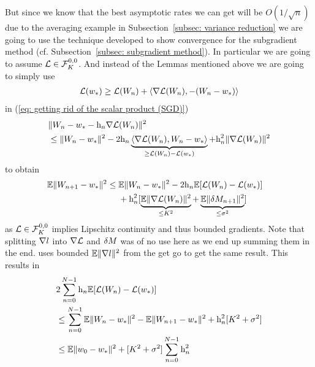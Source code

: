 But since we know that the best asymptotic rates we can get will be
\(O(1/\sqrt{n})\) due to the averaging example in Subsection~\ref{subsec:
variance reduction} we are going to use the technique developed to show
convergence for the subgradient method (cf. Subsection~\ref{subsec: subgradient
method}).
In particular we are going to assume \(\Loss \in
\lipGradientSet[0,0]{\lipConst}\). And instead of the Lemmas mentioned above we
are going to simply use 
\begin{align*}
	\Loss(\minimum)
	\ge \Loss(\Weights_n) + 
	\langle\nabla\Loss(\Weights_n), -(\Weights_n - \minimum)\rangle
\end{align*}
in (\ref{eq: getting rid of the scalar product (SGD)})
\begin{align*}
	&\|\Weights_n - \minimum - \lr_n\nabla\Loss(\Weights_n)\|^2\\
	&\le \|\Weights_n - \minimum\|^2
	- 2\lr_n\underbrace{\langle\nabla\Loss(\Weights_n), \Weights_n-\minimum\rangle}_{
		\ge \Loss(\Weights_n) - \Loss(\minimum)
	}
	+ \lr_n^2 \|\nabla\Loss(\Weights_n)\|^2
\end{align*}
to obtain
\begin{align*}
	\E\|\Weights_{n+1}-\minimum\|^2
	&\le
	\begin{aligned}[t]
		&\E\|\Weights_n -\minimum\|^2
		- 2\lr_n \E[\Loss(\Weights_n) - \Loss(\minimum)]\\
		&+ \lr_n^2 [
			\underbrace{\E\|\nabla\Loss(\Weights_n)\|^2}_{\le \lipConst^2}
			+ \underbrace{\E\|\martIncr_{n+1}\|^2}_{\le \stdBound^2}
		]
	\end{aligned}
\end{align*}
as \(\Loss\in\lipGradientSet[0,0]{\lipConst}\) implies Lipschitz continuity and thus bounded
gradients. Note that splitting \(\nabla\loss\) into \(\nabla\Loss\) and \(\martIncr\)
was of no use here as we end up summing them in the end. \textcite{nemirovskiRobustStochasticApproximation2009}
uses bounded \(\E\|\nabla\loss\|^2\) from the get go to get the same result.
This results in
\begin{align*}
	&2\sum_{n=0}^{N-1} \lr_n\E[\Loss(\Weights_n)-\Loss(\minimum)]\\
	&\le \sum_{n=0}^{N-1} \E\|\Weights_n -\minimum\|^2 - \E\|\Weights_{n+1}-\minimum\|^2
	+ \lr_n^2 [\lipConst^2 + \stdBound^2]\\
	&\le \E\|\weights_0 - \minimum\|^2 + [\lipConst^2+\stdBound^2]\sum_{n=0}^{N-1} \lr_n^2
\end{align*}
